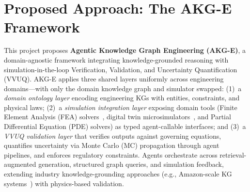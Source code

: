 \documentclass[conference, 10pt]{IEEEtran}
\begin{document}
\section{Proposed Approach: The AKG-E Framework}

This project proposes \textbf{Agentic Knowledge Graph Engineering (AKG-E)}, a domain-agnostic framework integrating knowledge-grounded reasoning with simulation-in-the-loop Verification, Validation, and Uncertainty Quantification (VVUQ). AKG-E applies three shared layers uniformly across engineering domains---with only the domain knowledge graph and simulator swapped: (1)~a \textit{domain ontology layer} encoding engineering KGs with entities, constraints, and physical laws; (2)~a \textit{simulation integration layer} exposing domain tools (Finite Element Analysis (FEA) solvers~\cite{Logg2012FEniCS}, digital twin microsimulators~\cite{Tao2019DigitalTwin}, and Partial Differential Equation (PDE) solvers) as typed agent-callable interfaces; and (3)~a \textit{VVUQ validation layer} that verifies outputs against governing equations, quantifies uncertainty via Monte Carlo (MC) propagation through agent pipelines, and enforces regulatory constraints. Agents orchestrate across retrieval-augmented generation, structured graph queries, and simulation feedback, extending industry knowledge-grounding approaches (e.g., Amazon-scale KG systems~\cite{Yu2024COSMO}) with physics-based validation.
\end{document}
